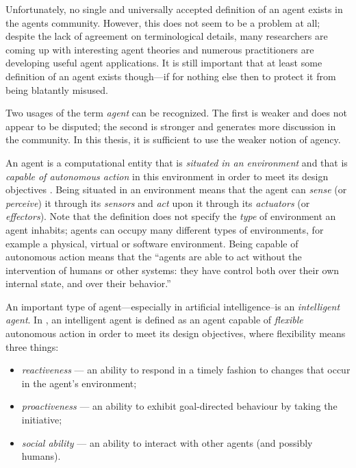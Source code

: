 Unfortunately, no single and universally accepted definition of an agent exists in the agents community.
However, this does not seem to be a problem at all; despite the lack of agreement on terminological details, many researchers are coming up with interesting agent theories and numerous practitioners are developing useful agent applications.
It is still important that at least some definition of an agent exists though---if for nothing else then to protect it from being blatantly misused.

Two usages of the term \textit{agent} can be recognized.
The first is weaker and does not appear to be disputed; the second is stronger and generates more discussion in the community.
In this thesis, it is sufficient to use the weaker notion of agency.

An agent is a computational entity that is \textit{situated in an environment} and that is \textit{capable of autonomous action} in this environment in order to meet its design objectives \cite{Wooldridge02}.
Being situated in an environment means that the agent can \textit{sense} (or \textit{perceive}) it through its \textit{sensors} and \textit{act} upon it through its \textit{actuators} (or \textit{effectors}).
Note that the definition does not specify the \textit{type} of environment an agent inhabits; agents can occupy many different types of environments, for example a physical, virtual or software environment.
Being capable of autonomous action means that the ``agents are able to act without the intervention of humans or other systems: they have control both over their own internal state, and over their behavior.'' \cite{Wooldridge02}

An important type of agent---especially in artificial intelligence--is an \textit{intelligent agent}.
In \cite{Wooldridge02}, an intelligent agent is defined as an agent capable of \textit{flexible} autonomous action in order to meet its design objectives, where flexibility means three things:
\begin{itemize}
	\item \textit{reactiveness} --- an ability to respond in a timely fashion to changes that occur in the agent's environment;
	\item \textit{proactiveness} --- an ability to exhibit goal-directed behaviour by taking the initiative;
	\item \textit{social ability} --- an ability to interact with other agents (and possibly humans).
\end{itemize}

